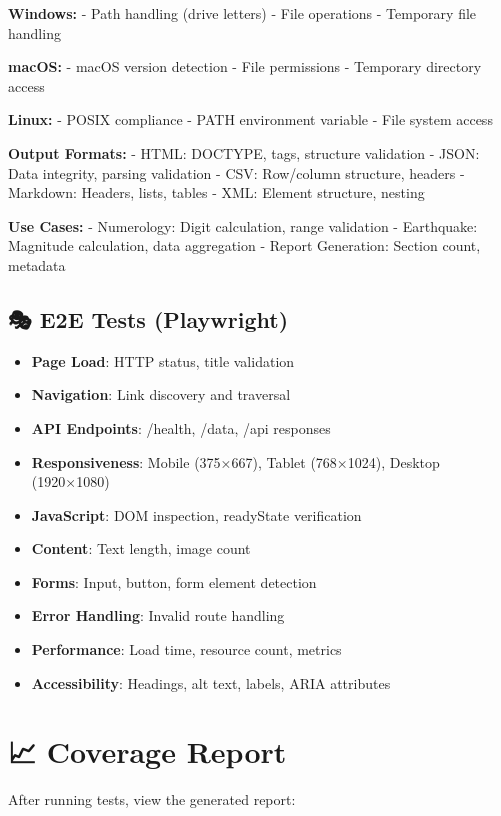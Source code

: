 \documentclass[
  11pt,
  oneside,
  openany]{scrbook}
\providecommand{\tightlist}{%
  \setlength{\itemsep}{0pt}\setlength{\parskip}{0pt}}\usepackage{longtable,booktabs,array}
\begin{document}
\textbf{Windows:} - Path handling (drive letters) - File operations -
Temporary file handling

\textbf{macOS:} - macOS version detection - File permissions - Temporary
directory access

\textbf{Linux:} - POSIX compliance - PATH environment variable - File
system access

\textbf{Output Formats:} - HTML: DOCTYPE, tags, structure validation -
JSON: Data integrity, parsing validation - CSV: Row/column structure,
headers - Markdown: Headers, lists, tables - XML: Element structure,
nesting

\textbf{Use Cases:} - Numerology: Digit calculation, range validation -
Earthquake: Magnitude calculation, data aggregation - Report Generation:
Section count, metadata

\subsection{🎭 E2E Tests (Playwright)}\label{e2e-tests-playwright}

\begin{itemize}
\tightlist
\item
  \textbf{Page Load}: HTTP status, title validation
\item
  \textbf{Navigation}: Link discovery and traversal
\item
  \textbf{API Endpoints}: /health, /data, /api responses
\item
  \textbf{Responsiveness}: Mobile (375×667), Tablet (768×1024), Desktop
  (1920×1080)
\item
  \textbf{JavaScript}: DOM inspection, readyState verification
\item
  \textbf{Content}: Text length, image count
\item
  \textbf{Forms}: Input, button, form element detection
\item
  \textbf{Error Handling}: Invalid route handling
\item
  \textbf{Performance}: Load time, resource count, metrics
\item
  \textbf{Accessibility}: Headings, alt text, labels, ARIA attributes
\end{itemize}

\section{📈 Coverage Report}\label{coverage-report}

After running tests, view the generated report:
\end{document}

